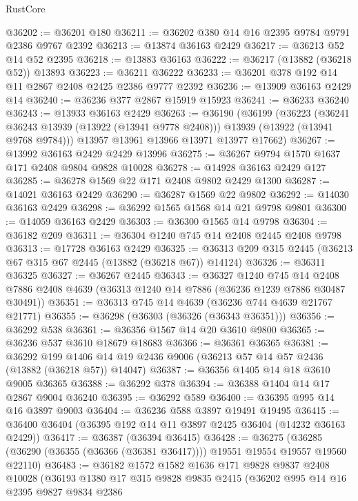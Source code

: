 \begin{lexlean}{RustCore}
\begin{coremodule}
@36202 := @36201 @180
@36211 := @36202 @380 @14 @16 @2395 @9784 @9791 @2386 @9767 @2392
@36213 := @13874 @36163 @2429
@36217 := @36213 @52 @14 @52 @2395
@36218 := @13883 @36163
@36222 := @36217 (@13882 (@36218 @52)) @13893
@36223 := @36211 @36222
@36233 := @36201 @378 @192 @14 @11 @2867 @2408 @2425 @2386 @9777 @2392
@36236 := @13909 @36163 @2429 @14
@36240 := @36236 @377 @2867 @15919 @15923
@36241 := @36233 @36240
@36243 := @13933 @36163 @2429
@36263 := @36190
    (@36199
      (@36223
        (@36241 @36243 @13939 (@13922 (@13941 @9778 @2408)))
        @13939
        (@13922 (@13941 @9768 @9784)))
      @13957
      @13961
      @13966
      @13971
      @13977
      @17662)
@36267 := @13992 @36163 @2429 @2429 @13996
@36275 := @36267 @9794 @1570 @1637 @171 @2408 @9804 @9828 @10028
@36278 := @14928 @36163 @2429 @127
@36285 := @36278 @1569 @22 @171 @2408 @9802 @2429 @1300
@36287 := @14021 @36163 @2429
@36290 := @36287 @1569 @22 @9802
@36292 := @14030 @36163 @2429
@36298 := @36292 @1565 @1568 @14 @21 @9798 @9801
@36300 := @14059 @36163 @2429
@36303 := @36300 @1565 @14 @9798
@36304 := @36182 @209
@36311 := @36304 @1240 @745 @14 @2408 @2445 @2408 @9798
@36313 := @17728 @36163 @2429
@36325 := @36313 @209 @315 @2445 (@36213 @67 @315 @67 @2445 (@13882 (@36218 @67)) @14124)
@36326 := @36311 @36325
@36327 := @36267 @2445
@36343 := @36327
    @1240
    @745
    @14
    @2408
    @7886
    @2408
    @4639
    (@36313 @1240 @14 @7886 (@36236 @1239 @7886 @30487 @30491))
@36351 := @36313 @745 @14 @4639 (@36236 @744 @4639 @21767 @21771)
@36355 := @36298 (@36303 (@36326 (@36343 @36351)))
@36356 := @36292 @538
@36361 := @36356 @1567 @14 @20 @3610 @9800
@36365 := @36236 @537 @3610 @18679 @18683
@36366 := @36361 @36365
@36381 := @36292
    @199
    @1406
    @14
    @19
    @2436
    @9006
    (@36213 @57 @14 @57 @2436 (@13882 (@36218 @57)) @14047)
@36387 := @36356 @1405 @14 @18 @3610 @9005 @36365
@36388 := @36292 @378
@36394 := @36388 @1404 @14 @17 @2867 @9004 @36240
@36395 := @36292 @589
@36400 := @36395 @995 @14 @16 @3897 @9003
@36404 := @36236 @588 @3897 @19491 @19495
@36415 := @36400 @36404 (@36395 @192 @14 @11 @3897 @2425 @36404 (@14232 @36163 @2429))
@36417 := @36387 (@36394 @36415)
@36428 := @36275
    (@36285 (@36290 (@36355 (@36366 (@36381 @36417)))) @19551 @19554 @19557 @19560 @22110)
@36483 := @36182
    @1572
    @1582
    @1636
    @171
    @9828
    @9837
    @2408
    @10028
    (@36193
      @1380
      @17
      @315
      @9828
      @9835
      @2415
      (@36202
        @995
        @14
        @16
        @2395
        @9827
        @9834
        @2386

\end{coremodule}
\end{lexlean}
